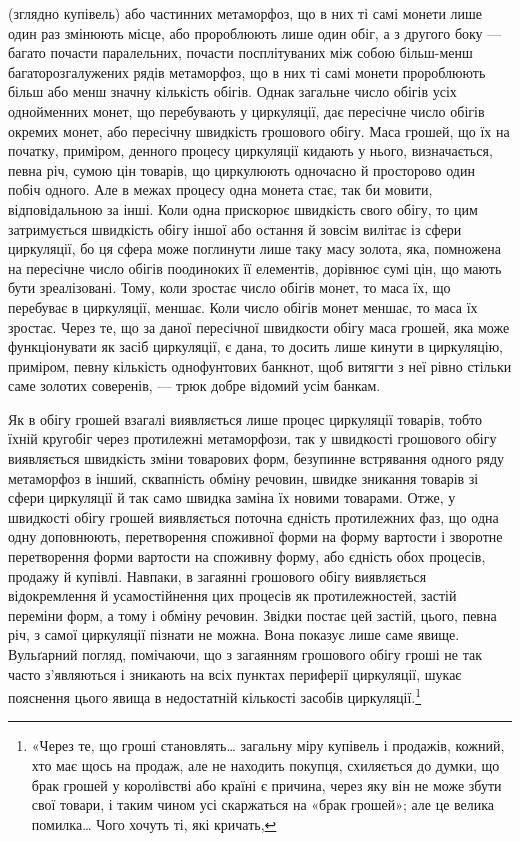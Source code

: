 \parcont{}  %
(зглядно купівель) або частинних метаморфоз, що в них ті самі
монети лише один раз змінюють місце, або пророблюють лише
один обіг, а з другого боку — багато почасти паралельних,
почасти посплітуваних між собою більш-менш багаторозгалужених
рядів метаморфоз, що в них ті самі монети пророблюють
більш або менш значну кількість обігів. Однак загальне число
обігів усіх однойменних монет, що перебувають у циркуляції,
дає пересічне число обігів окремих монет, або пересічну швидкість
грошового обігу. Маса грошей, що їх на початку, приміром,
денного процесу циркуляції кидають у нього, визначається,
певна річ, сумою цін товарів, що циркулюють одночасно й просторово
один побіч одного. Але в межах процесу одна монета
стає, так би мовити, відповідальною за інші. Коли одна прискорює
швидкість свого обігу, то цим затримується швидкість обігу
іншої або остання й зовсім вилітає із сфери циркуляції, бо ця
сфера може поглинути лише таку масу золота, яка, помножена
на пересічне число обігів поодиноких її елементів, дорівнює сумі
цін, що мають бути зреалізовані. Тому, коли зростає число обігів
монет, то маса їх, що перебуває в циркуляції, меншає. Коли
число обігів монет меншає, то маса їх зростає. Через те, що за
даної пересічної швидкости обігу маса грошей, яка може функціонувати
як засіб циркуляції, є дана, то досить лише кинути
в циркуляцію, приміром, певну кількість однофунтових банкнот,
щоб витягти з неї рівно стільки саме золотих соверенів, — трюк
добре відомий усім банкам.

Як в обігу грошей взагалі виявляється лише процес циркуляції
товарів, тобто їхній кругобіг через протилежні метаморфози,
так у швидкості грошового обігу виявляється швидкість зміни
товарових форм, безупинне встрявання одного ряду метаморфоз
в інший, сквапність обміну речовин, швидке зникання товарів
зі сфери циркуляції й так само швидка заміна їх новими товарами.
Отже, у швидкості обігу грошей виявляється поточна єдність
протилежних фаз, що одна одну доповнюють, перетворення
споживної форми на форму вартости і зворотне перетворення
форми вартости на споживну форму, або єдність обох процесів,
продажу й купівлі. Навпаки, в загаянні грошового обігу виявляється
відокремлення й усамостійнення цих процесів як протилежностей,
застій переміни форм, а тому і обміну речовин. Звідки
постає цей застій, цього, певна річ, з самої циркуляції пізнати
не можна. Вона показує лише саме явище. Вульґарний погляд,
помічаючи, що з загаянням грошового обігу гроші не так часто
з’являються і зникають на всіх пунктах периферії циркуляції,
шукає пояснення цього явища в недостатній кількості засобів
циркуляції.\footnote{
«Через те, що гроші становлять\dots{} загальну міру купівель і продажів,
кожний, хто має щось на продаж, але не находить покупця, схиляється
до думки, що брак грошей у королівстві або країні є причина,
через яку він не може збути свої товари, і таким чином усі скаржаться на
«брак грошей»; але це велика помилка\dots{} Чого хочуть ті, які кричать,
}

